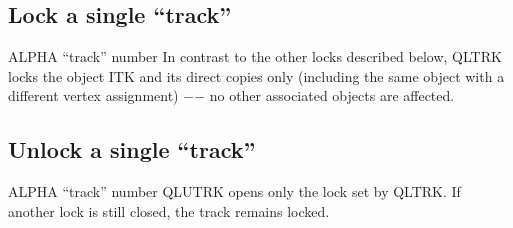 \subsection{\label{sec-QLI}Lock a single ``track''}
\par
{}
\par
\par
\begin{indentlist}{ 3.25cm}{ 3.50cm}
ALPHA ``track'' number
In contrast to the other locks described below, QLTRK locks
the object ITK and its direct copies only (including the same
object with a different vertex assignment)
$-$$-$ no other associated
objects are affected.
\end{indentlist}
\subsection{\label{sec-QLU}Unlock a single ``track''}
\par
{}
\par
\par
\begin{indentlist}{ 3.25cm}{ 3.50cm}
ALPHA ``track'' number
QLUTRK opens only the lock set by QLTRK. If another lock is
still closed, the track remains locked.
\end{indentlist}
